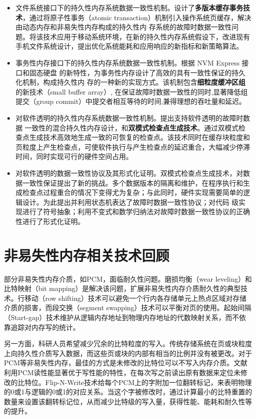 \begin{itemize}
\item 文件系统接口下的持久性内存系统数据一致性机制。设计了\textbf{多版本缓存事务技术}，通过将原子性事务（atomic transaction）机制引入操作系统页缓存，解决由动态内存和非易失性内存构成的持久性内
存系统的故障时数据一致性问题。将该技术应用于移动系统环境，在新的持久性内存系统假设下，改进现有手机文件系统设计，提出优化系统能耗和应用响应的新指标和新策略算法。
\item 事务性内存接口下的持久性内存系统数据一致性机制。根据 NVM Express 接口和固态硬盘
的新特性，为事务性内存设计了高效的具有一致性保证的持久化机制，构成持久性内
存的一种新的实现方式。该机制包含\textbf{细粒度缓冲区组}的新技术（small buffer array）,
在保证故障时数据一致性的同时,显著降低组提交（group commit）中提交者相互等待的时间,兼得理想的吞吐量和延迟。
\item 对软件透明的持久性内存系统数据一致性机制。提出支持软件透明的故障时数据
一致性的混合持久性内存设计，和\textbf{双模式检查点生成技术}。通过双模式检查点生成技术高效地生成一致的可恢复的检查点。该技术同时在缓存块粒度和页粒度上产生检查点，可使软件执行与产生检查点的延迟重合，大幅减少停滞时间，同时实现可行的硬件空间占用。
\item 对软件透明的数据一致性协议及其形式化证明。双模式检查点生成技术，对数据一致性保证提出了新的挑战。多个数据版本的隔离和维护，在程序执行和生成检查点过程重合的情况下变得尤为复杂；与此同时，硬件实现需要简单的逻辑设计。为此提出并利用状态机表达了故障时数据一致性协议；对代码
级实现进行了符号抽象；利用不变式和数学归纳法对故障时数据一致性协议的正确性进行了形式化证明。
\end{itemize}

\section{非易失性内存相关技术回顾}
\label{intro:nvm-review}

部分非易失性内存介质，如PCM，面临耐久性问题。磨损均衡（wear leveling）和比特映射（bit mapping）是解决该问题，扩展非易失性内存介质耐久性的典型技术。行移动（row shifting）技术可以避免一个行内各存储单元上热点区域对存储介质的损害，而段交换（segment swapping）技术\cite{Qureshi:2009:SHP:1555754.1555760}可以平衡对页的使用\cite{Zhou:2009:DEE:1555754.1555759}。起始间隔（Start-gap）技术\cite{Qureshi:2009:SHP:1555754.1555760}维护从逻辑内存地址到物理内存地址的代数映射关系，而不依靠追踪对内存写的统计。

另一方面，科研人员希望减少冗余的比特粒度的写入。传统存储系统在页或块粒度上向持久性介质写入数据，而这些页或块的内部有相当的比例并没有被更改。对于PCM等非易失性内存，最佳的方式是未修改的比特位可以不写入内存介质。文献\cite{Zhou:2009:DEE:1555754.1555759}利用PCM读性能显著优于写性能的特性，在每次写之前读出原有数据来定位未修改的比特位。Flip-N-Write\cite{5375405}技术给每个PCM上的字附加一位翻转标记，来表明物理的0或1与逻辑的0或1的对应关系。当这个字被修改时，通过计算最小的比特重置的数量来设置该翻转标记位，从而减少比特级的写入量，获得性能、能耗和耐久性等的提升。

